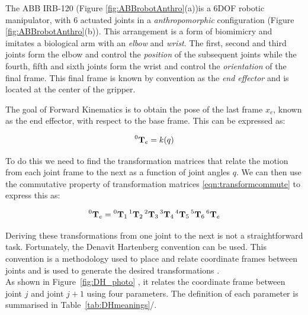 \documentclass{UoNMCHA}
\numberwithin{equation}{section}
\begin{document}
The ABB IRB-120 (Figure \ref{fig:ABBrobotAnthro}(a))is a 6DOF robotic manipulator, with 6 actuated joints in a \textit{anthropomorphic} configuration (Figure \ref{fig:ABBrobotAnthro}(b)). This arrangement is a form of biomimicry and imitates a biological arm with an \textit{elbow} and \textit{wrist}. The first, second and third joints form the elbow and control the \textit{position} of the subsequent joints while the fourth, fifth and sixth joints form the wrist and control the \textit{orientation} of the final frame. This final frame is known by convention as the \textit{end effector} and is located at the center of the gripper.\

The goal of Forward Kinematics is to obtain the pose of the last frame $x_e$, known as the end effector, with respect to the base frame. This can be expressed as:

\begin{equation}
	\prescript{0}{}{\mathbf{T}}_{e} = k(q)
\end{equation}

To do this we need to find the transformation matrices that relate the motion from each joint frame to the next as a function of joint angles $q$. We can then use the commutative property of transformation matrices \ref{eqn:transformcommute} to express this as:

\begin{equation}\label{eqn:Transformationmatrixjointangles}
	\prescript{0}{}{\mathbf{T}}_{e} = \prescript{0}{}{\mathbf{T}}_{1} \prescript{1}{}{\mathbf{T}}_{2} \prescript{2}{}{\mathbf{T}}_{3} \prescript{3}{}{\mathbf{T}}_{4} \prescript{4}{}{\mathbf{T}}_{5} \prescript{5}{}{\mathbf{T}}_{6} \prescript{6}{}{\mathbf{T}}_{e}
\end{equation}

Deriving these transformations from one joint to the next is not a straightforward task. Fortunately, 
the Denavit Hartenberg convention can be used. This convention is a methodology used to place and relate coordinate frames between joints and is used to generate the desired transformations \citep{hartenberg1964kinematic, hartenberg1955kinematic}.\\

As shown in Figure~\ref{fig:DH_photo} , it relates the coordinate frame between joint $j$ and joint $j+1$ using four parameters. The definition of each parameter is summarised in Table~\ref{tab:DHmeanings}/.
\end{document}
